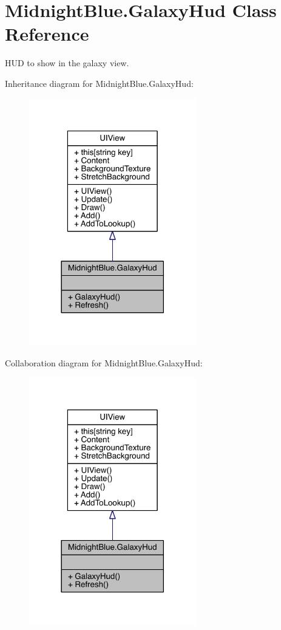 \hypertarget{class_midnight_blue_1_1_galaxy_hud}{}\section{Midnight\+Blue.\+Galaxy\+Hud Class Reference}
\label{class_midnight_blue_1_1_galaxy_hud}


H\+UD to show in the galaxy view.  




Inheritance diagram for Midnight\+Blue.\+Galaxy\+Hud\+:
\nopagebreak
\begin{figure}[H]
\begin{center}
\leavevmode
\includegraphics[width=206pt]{class_midnight_blue_1_1_galaxy_hud__inherit__graph}
\end{center}
\end{figure}


Collaboration diagram for Midnight\+Blue.\+Galaxy\+Hud\+:
\nopagebreak
\begin{figure}[H]
\begin{center}
\leavevmode
\includegraphics[width=206pt]{class_midnight_blue_1_1_galaxy_hud__coll__graph}
\end{center}
\end{figure}
